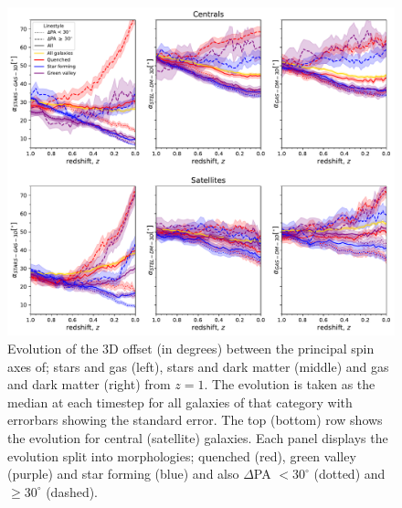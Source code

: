 \begin{figure}
	\includegraphics[width=\linewidth]{misalignment_TNG/3D_pa_evo_cen_sat.pdf}
    \caption{Evolution of the 3D offset (in degrees) between the principal spin axes of; stars and gas (left), stars and dark matter (middle) and gas and dark matter (right) from $z=1$. The evolution is taken as the median at each timestep for all galaxies of that category with errorbars showing the standard error. The top (bottom) row shows the evolution for central (satellite) galaxies. Each panel displays the evolution split into morphologies; quenched (red), green valley (purple) and star forming (blue) and also $\Delta$PA $< 30^{\circ}$ (dotted) and $\geq 30^{\circ}$ (dashed).}
    \label{fig:3D_alpha_evo}
\end{figure}


